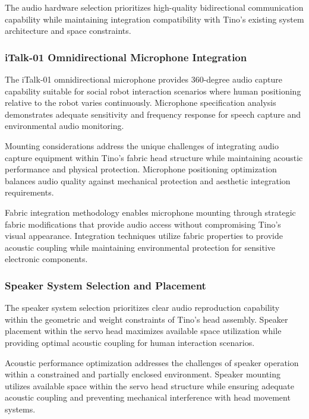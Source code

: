 The audio hardware selection prioritizes high-quality bidirectional communication capability while maintaining integration compatibility with Tino's existing system architecture and space constraints.

\subsubsection{iTalk-01 Omnidirectional Microphone Integration}

The iTalk-01 omnidirectional microphone provides 360-degree audio capture capability suitable for social robot interaction scenarios where human positioning relative to the robot varies continuously. Microphone specification analysis demonstrates adequate sensitivity and frequency response for speech capture and environmental audio monitoring.

Mounting considerations address the unique challenges of integrating audio capture equipment within Tino's fabric head structure while maintaining acoustic performance and physical protection. Microphone positioning optimization balances audio quality against mechanical protection and aesthetic integration requirements.

Fabric integration methodology enables microphone mounting through strategic fabric modifications that provide audio access without compromising Tino's visual appearance. Integration techniques utilize fabric properties to provide acoustic coupling while maintaining environmental protection for sensitive electronic components.

\subsubsection{Speaker System Selection and Placement}

The speaker system selection prioritizes clear audio reproduction capability within the geometric and weight constraints of Tino's head assembly. Speaker placement within the servo head maximizes available space utilization while providing optimal acoustic coupling for human interaction scenarios.

Acoustic performance optimization addresses the challenges of speaker operation within a constrained and partially enclosed environment. Speaker mounting utilizes available space within the servo head structure while ensuring adequate acoustic coupling and preventing mechanical interference with head movement systems.

